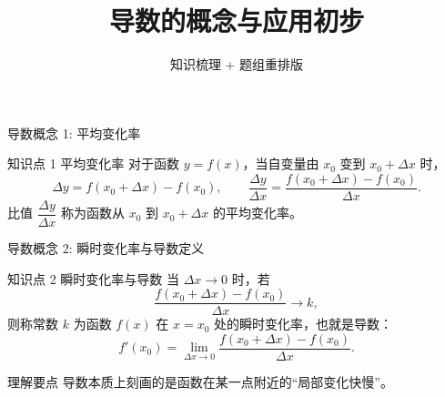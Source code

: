 ﻿\documentclass[aspectratio=169,10pt]{ctexbeamer}
\title{导数的概念与应用初步}
\subtitle{知识梳理 + 题组重排版}
\author{}
\date{}
\begin{document}
\begin{frame}
  \titlepage
\end{frame}

\begin{frame}[t]{导数概念 1: 平均变化率}
\small
\begin{block}{知识点 1 平均变化率}
对于函数 $y=f(x)$，当自变量由 $x_0$ 变到 $x_0+\Delta x$ 时，
\[
\Delta y=f(x_0+\Delta x)-f(x_0),\qquad
\frac{\Delta y}{\Delta x}=\frac{f(x_0+\Delta x)-f(x_0)}{\Delta x}.
\]
比值 $\dfrac{\Delta y}{\Delta x}$ 称为函数从 $x_0$ 到 $x_0+\Delta x$ 的平均变化率。
\end{block}
\end{frame}

\begin{frame}[t]{导数概念 2: 瞬时变化率与导数定义}
\small
\begin{block}{知识点 2 瞬时变化率与导数}
当 $\Delta x\to 0$ 时，若
\[
\frac{f(x_0+\Delta x)-f(x_0)}{\Delta x}\to k,
\]
则称常数 $k$ 为函数 $f(x)$ 在 $x=x_0$ 处的瞬时变化率，也就是导数：
\[
f'(x_0)=\lim_{\Delta x\to 0}\frac{f(x_0+\Delta x)-f(x_0)}{\Delta x}.
\]
\end{block}

\begin{alertblock}{理解要点}
导数本质上刻画的是函数在某一点附近的“局部变化快慢”。
\end{alertblock}
\end{frame}
\end{document}
